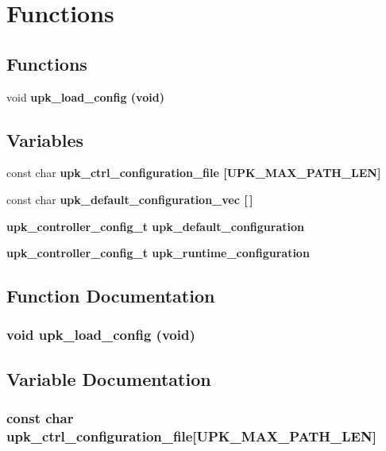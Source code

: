 \section{Functions}
\label{group__functions}
\subsection*{Functions}
\begin{CompactItemize}
\item 
void \bf{upk\_\-load\_\-config} (void)
\end{CompactItemize}
\subsection*{Variables}
\begin{CompactItemize}
\item 
const char \bf{upk\_\-ctrl\_\-configuration\_\-file} [UPK\_\-MAX\_\-PATH\_\-LEN]
\item 
const char \bf{upk\_\-default\_\-configuration\_\-vec} [$\,$]
\item 
\bf{upk\_\-controller\_\-config\_\-t} \bf{upk\_\-default\_\-configuration}
\item 
\bf{upk\_\-controller\_\-config\_\-t} \bf{upk\_\-runtime\_\-configuration}
\end{CompactItemize}


\subsection{Function Documentation}
\subsubsection{\setlength{\rightskip}{0pt plus 5cm}void upk\_\-load\_\-config (void)}\label{group__functions_gcb11c3f64ed3828f1bdf713b493bef1b}




\subsection{Variable Documentation}
\subsubsection{\setlength{\rightskip}{0pt plus 5cm}const char \bf{upk\_\-ctrl\_\-configuration\_\-file}[UPK\_\-MAX\_\-PATH\_\-LEN]}\label{group__functions_g8d40b48c45f9a4e84616919266172937}


